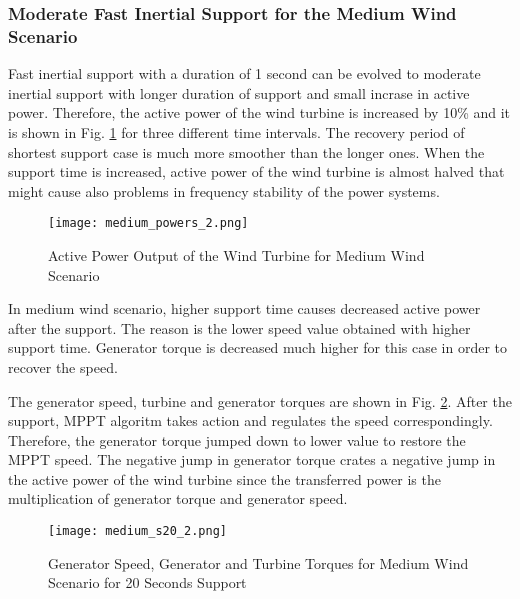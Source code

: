 \subsubsection{Moderate Fast Inertial Support for the Medium Wind Scenario}
Fast inertial support with a duration of 1 second can be evolved to moderate inertial support with longer duration of support and small incrase in active power. Therefore, the active power of the wind turbine is increased by 10\% and it is shown in Fig. \ref{midpowers} for three different time intervals. The recovery period of shortest support case is much more smoother than the longer ones. When the support time is increased, active power of the wind turbine is almost halved that might cause also problems in frequency stability of the power systems. \par
\begin{figure}[h!]
	\centering
	\texttt{[image: medium\_powers\_2.png]}
	\caption{Active Power Output of the Wind Turbine for Medium Wind Scenario}
	\label{midpowers}
\end{figure}
In medium wind scenario, higher support time causes decreased active power after the support. The reason is the lower speed value obtained with higher support time. Generator torque is decreased much higher for this case in order to recover the speed. \par
The generator speed, turbine and generator torques are shown in Fig. \ref{mid_torques3}. After the support, MPPT algoritm takes action and regulates the speed correspondingly. Therefore, the generator torque jumped down to lower value to restore the MPPT speed. The negative jump in generator torque crates a negative jump in the active power of the wind turbine since the transferred power is the multiplication of generator torque and generator speed.\par
\begin{figure}[h!]
	\centering
	\texttt{[image: medium\_s20\_2.png]}
	\caption{Generator Speed, Generator and Turbine Torques for Medium Wind Scenario for 20 Seconds Support}
	\label{mid_torques3}
\end{figure}

